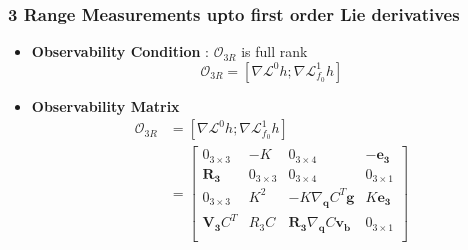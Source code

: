 \documentclass[]{article}
\begin{document}
\subsubsection{3 Range Measurements upto first order Lie derivatives}
\begin{itemize}
	\item \textbf{Observability Condition} : $\mathcal{O}_{3R}$ is full rank
	\begin{equation*}
		\mathcal{O}_{3R} = [\nabla\mathcal{L}^0h;\nabla\mathcal{L}^1_{f_0}h]
	\end{equation*}
		
	\item \textbf{Observability Matrix}
	\begin{align*}
	\mathcal{O}_{3R} &= [\nabla\mathcal{L}^0h;\nabla\mathcal{L}^1_{f_0}h]\\ 
	&= \begin{bmatrix}
	0_{3\times 3}& -K& 0_{3\times 4}& -\bm{e_3}\\
	\bm{R_3} & 0_{3\times 3} & 0_{3\times 4} & 0_{3\times 1}\\
	0_{3\times 3}& K^2& -K\nabla_{\bm{q}} C^T\bm{g}& K\bm{e_3}\\
	\bm{V_3} C^T & R_3C & \bm{R_3}\nabla_{\bm{q}} C\bm{v_b} & 0_{3\times 1}\\
	\end{bmatrix}
	\end{align*}
	

\end{itemize}
\end{document}
